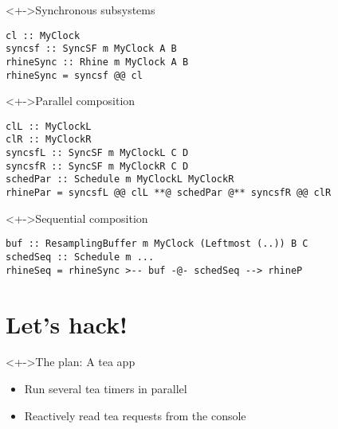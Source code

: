 \documentclass[handout]{enigtex-beamer-base}
\begin{document}
\begin{frame}[fragile]
\begin{block}<+->{Synchronous subsystems}
\begin{verbatim}
cl :: MyClock
syncsf :: SyncSF m MyClock A B
rhineSync :: Rhine m MyClock A B
rhineSync = syncsf @@ cl
\end{verbatim}
\end{block}
\end{frame}

\begin{frame}[fragile]
\begin{block}<+->{Parallel composition}
\begin{verbatim}
clL :: MyClockL
clR :: MyClockR
syncsfL :: SyncSF m MyClockL C D
syncsfR :: SyncSF m MyClockR C D
schedPar :: Schedule m MyClockL MyClockR
rhinePar = syncsfL @@ clL **@ schedPar @** syncsfR @@ clR
\end{verbatim}
\end{block}
\begin{block}<+->{Sequential composition}
\begin{verbatim}
buf :: ResamplingBuffer m MyClock (Leftmost (..)) B C
schedSeq :: Schedule m ...
rhineSeq = rhineSync >-- buf -@- schedSeq --> rhineP
\end{verbatim}
\end{block}
\end{frame}

\begin{comment}
	Introduction what Rhine can do
	Basic vocab
		Arrowized FRP
		Synchronous subsystems
		Clocks
		Schedules
		Resampling buffers
		Events and behaviours
	Comparison (differences, +, -) to
		Yampa
		dunai, auto, varying
		classical FRP
		Pipes, conduit
	Further plan
		Mission statement what we want to implement
			Ideas
				FRP zoo
					Extra features?
				Tea time
					First without, then with GUI
		Given enough time, implement audience suggestions
\end{comment}

\section{Let's hack!}

\begin{frame}
\begin{block}<+->{The plan: A tea app}
	\begin{itemize}
		\item Run several tea timers in parallel
		\item Reactively read tea requests from the console
	\end{itemize}
\end{block}
\end{frame}
\end{document}
